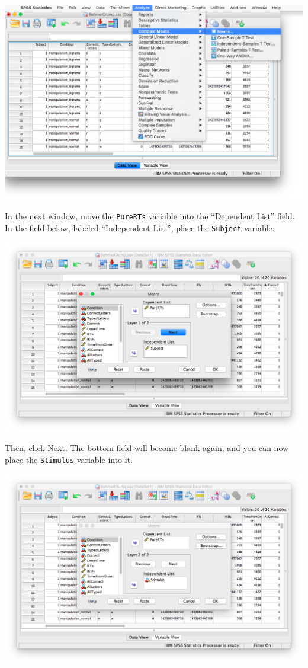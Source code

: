 \documentclass[
]{book}
\begin{document}
\includegraphics{img/9.4.18.png}

In the next window, move the \texttt{PureRTs} variable into the ``Dependent List'' field. In the field below, labeled ``Independent List'', place the \texttt{Subject} variable:

\includegraphics{img/9.4.19.png}

Then, click {Next}. The bottom field will become blank again, and you can now place the \texttt{Stimulus} variable into it.

\includegraphics{img/9.4.20.png}
\end{document}

